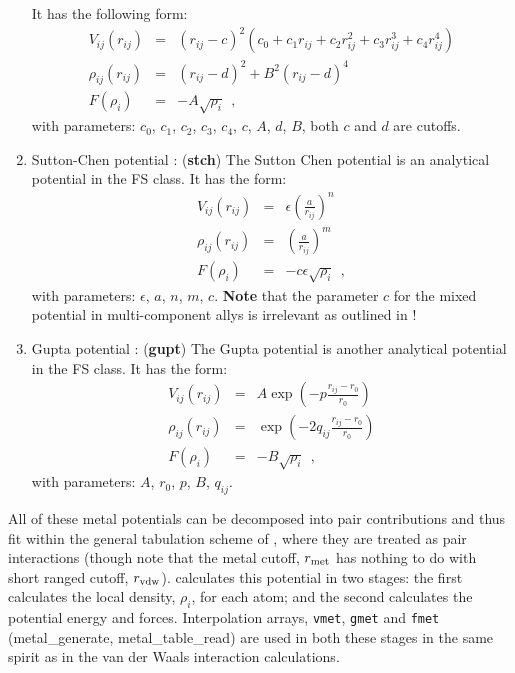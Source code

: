 \begin{enumerate}
It has the following form:
\begin{eqnarray}
V_{ij}(r_{ij}) &=& (r_{ij}-c)^{2}
(c_{0}+c_{1}r_{ij}+c_{2}r_{ij}^{2}+c_{3}r_{ij}^{3}+c_{4}r_{ij}^{4}) \nonumber \\
\rho_{ij}(r_{ij}) &=& (r_{ij}-d)^{2} + B^{2} (r_{ij}-d)^{4} \\
F(\rho_{i}) &=& -A \sqrt{\rho_{i}}~~, \nonumber
\end{eqnarray}
with parameters: $c_{0}$, $c_{1}$, $c_{2}$, $c_{3}$, $c_{4}$, $c$, $A$, $d$, $B$,
both $c$ and $d$ are cutoffs.
\item Sutton-Chen potential \cite{sutton-90a,sutton-91a,todd-93a}:
({\bf stch})
The Sutton Chen potential is an analytical potential in the FS
class.  It has the form:
\begin{eqnarray}
V_{ij}(r_{ij}) &=& \epsilon \left( \frac{a}{r_{ij}} \right)^{n} \nonumber \\
\rho_{ij}(r_{ij}) &=& \left( \frac{a}{r_{ij}} \right)^{m} \\
F(\rho_{i}) &=& -c \epsilon \sqrt{\rho_{i}}~~, \nonumber
\end{eqnarray}
with parameters: $\epsilon$, $a$, $n$, $m$, $c$.  {\bf Note} that
the parameter $c$ for the mixed potential in multi-component allys
is irrelevant as outlined in \cite{sutton-91a}!
\item Gupta potential \cite{cleri-93a}:  ({\bf gupt})
The Gupta potential is another analytical potential in the FS
class.  It has the form:
\begin{eqnarray}
V_{ij}(r_{ij}) &=& A \exp \left(-p \frac{r_{ij}-r_{0}}{r_{0}}\right) \nonumber \\
\rho_{ij}(r_{ij}) &=& \exp \left(-2 q_{ij} \frac{r_{ij}-r_{0}}{r_{0}}\right) \\
F(\rho_{i}) &=& -B \sqrt{\rho_{i}}~~, \nonumber
\end{eqnarray}
with parameters: $A$, $r_{0}$, $p$, $B$, $q_{ij}$.
\end{enumerate}

All of these metal potentials can be decomposed into pair
contributions and thus fit within the general tabulation scheme of \D,
where they are treated as pair interactions (though note that the
metal cutoff, $r_{\rm met}$ has nothing to do with short ranged cutoff,
$r_{\rm vdw}$).  \D calculates this potential in two stages: the first
calculates the local density, $\rho_{i}$, for each atom; and the
second calculates the potential energy and forces.  Interpolation
arrays, {\tt vmet}, {\tt gmet} and {\tt fmet} ({\sc metal\_generate},
{\sc metal\_table\_read}) are used in both these stages in the same
spirit as in the van der Waals interaction calculations.

